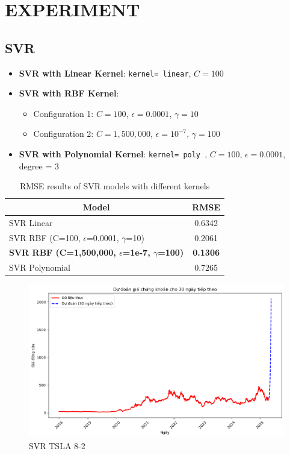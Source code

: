 \documentclass[12pt]{article}
\begin{document}
\section{EXPERIMENT}
\subsection{SVR}

\begin{itemize}
    \item \textbf{SVR with Linear Kernel}: \texttt{kernel= linear}, \( C = 100 \)
    \item \textbf{SVR with RBF Kernel}:
    \begin{itemize}
        \item Configuration 1: \( C = 100 \), \( \epsilon = 0.0001 \), \( \gamma = 10 \)
        \item Configuration 2: \( C = 1{,}500{,}000 \), \( \epsilon = 10^{-7} \), \( \gamma = 100 \)
    \end{itemize}
    \item \textbf{SVR with Polynomial Kernel}: \texttt{kernel= poly }, \( C = 100 \), \( \epsilon = 0.0001 \), degree = 3
\end{itemize}
\begin{table}[H]
    \centering
    \caption{RMSE results of SVR models with different kernels}
    \label{tab:svr_results}
    \begin{tabular}{|l|c|}
        \hline
        \multicolumn{1}{|c|}{\textbf{Model}} & \textbf{RMSE} \\
        \hline
        SVR Linear & 0.6342 \\
        SVR RBF (C=100, $\epsilon$=0.0001, $\gamma$=10) & 0.2061 \\
        \textbf{SVR RBF (C=1,500,000, $\epsilon$=1e-7, $\gamma$=100)} & \textbf{0.1306} \\
        SVR Polynomial & 0.7265 \\
        \hline
    \end{tabular}
\end{table}

\begin{figure}[H]
    \centering
    \includegraphics[width=0.5\linewidth]{SVR.png}
    \caption{SVR TSLA 8-2 }
    \label{fig:boxplot}
\end{figure}
\end{document}
